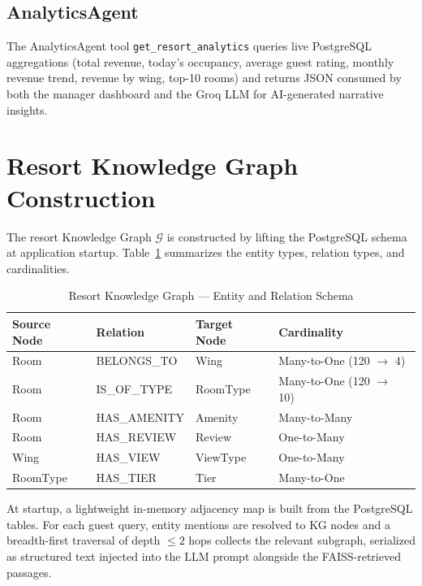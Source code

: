 \documentclass[11pt,a4paper]{report}
\begin{document}
\subsection{AnalyticsAgent}

The AnalyticsAgent tool \texttt{get\_resort\_analytics} queries live PostgreSQL aggregations (total revenue, today's occupancy, average guest rating, monthly revenue trend, revenue by wing, top-10 rooms) and returns JSON consumed by both the manager dashboard and the Groq LLM for AI-generated narrative insights.

\section{Resort Knowledge Graph Construction}

The resort Knowledge Graph $\mathcal{G}$ is constructed by lifting the PostgreSQL schema at application startup. Table~\ref{tab:kg_schema} summarizes the entity types, relation types, and cardinalities.

\begin{table}[H]
\centering
\caption{Resort Knowledge Graph — Entity and Relation Schema}
\label{tab:kg_schema}
\renewcommand{\arraystretch}{1.3}
\begin{tabular}{p{3cm} p{3cm} p{3cm} p{4cm}}
\toprule
\textbf{Source Node} & \textbf{Relation} & \textbf{Target Node} & \textbf{Cardinality} \\
\midrule
\rowcolor{rowgray}
Room & BELONGS\_TO & Wing & Many-to-One (120 $\rightarrow$ 4) \\
Room & IS\_OF\_TYPE & RoomType & Many-to-One (120 $\rightarrow$ 10) \\
\rowcolor{rowgray}
Room & HAS\_AMENITY & Amenity & Many-to-Many \\
Room & HAS\_REVIEW & Review & One-to-Many \\
\rowcolor{rowgray}
Wing & HAS\_VIEW & ViewType & One-to-Many \\
RoomType & HAS\_TIER & Tier & Many-to-One \\
\bottomrule
\end{tabular}
\end{table}

At startup, a lightweight in-memory adjacency map is built from the PostgreSQL tables. For each guest query, entity mentions are resolved to KG nodes and a breadth-first traversal of depth $\leq 2$ hops collects the relevant subgraph, serialized as structured text injected into the LLM prompt alongside the FAISS-retrieved passages.
\end{document}
